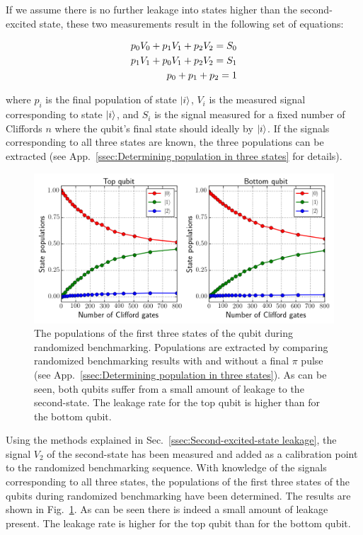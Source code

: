         If we assume there is no further leakage into states higher than the second-excited state, these two measurements result in the following set of equations:

        \begin{align}
          p_0 V_0 + p_1 V_1 + p_2 V_2 = S_0 \notag\\
          p_1 V_1 + p_0 V_1 + p_2 V_2 = S_1 \notag\\
          p_0 + p_1 + p_2 = 1
          \label{eq:three populations equations}
        \end{align}

        where $p_i$ is the final population of state $\ket{i}$, $V_i$ is the measured signal corresponding to state $\ket{i}$, and $S_i$ is the signal measured for a fixed number of Cliffords $n$ where the qubit's final state should ideally by $\ket{i}$. If the signals corresponding to all three states are known, the three populations can be extracted (see App.~\ref{ssec:Determining population in three states} for details).

        \begin{figure}[tb]
          \centering
          \includegraphics[width=\textwidth]{Figures/Randomized benchmarking/RB_normal_state_populations.png}
          \caption{The populations of the first three states of the qubit during randomized benchmarking. Populations are extracted by comparing randomized benchmarking results with and without a final $\pi$ pulse (see App.~\ref{ssec:Determining population in three states}). As can be seen, both qubits suffer from a small amount of leakage to the second-state. The leakage rate for the top qubit is higher than for the bottom qubit.}
          \label{fig:RB normal state populations}
        \end{figure}

        Using the methods explained in Sec.~\ref{ssec:Second-excited-state leakage}, the signal $V_2$ of the second-state has been measured and added as a calibration point to the randomized benchmarking sequence. With knowledge of the signals corresponding to all three states, the populations of the first three states of the qubits during randomized benchmarking have been determined. The results are shown in Fig.~\ref{fig:RB normal state populations}. As can be seen there is indeed a small amount of leakage present. The leakage rate is higher for the top qubit than for the bottom qubit.

